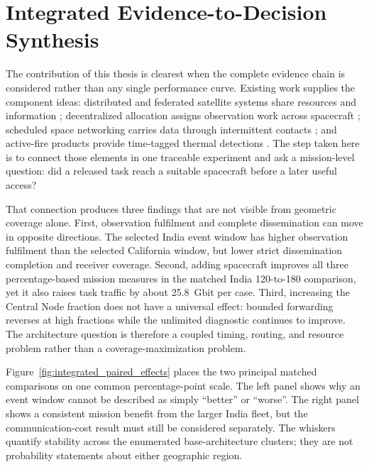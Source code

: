 \clearpage
\section{Integrated Evidence-to-Decision Synthesis}
\label{sec:integrated_synthesis}

The contribution of this thesis is clearest when the complete evidence chain is considered rather than any single performance curve. Existing work supplies the component ideas: distributed and federated satellite systems share resources and information \citep{Golkar2015,Scrocciolani2024,Messina2025}; decentralized allocation assigns observation work across spacecraft \citep{Parjan2023,Zilberstein2025}; scheduled space networking carries data through intermittent contacts \citep{Burleigh2022,Araniti2015,CCSDS2019}; and active-fire products provide time-tagged thermal detections \citep{Wooster2005,Schroeder2014,WoosterSLSTR2012,XuWooster2023}. The step taken here is to connect those elements in one traceable experiment and ask a mission-level question: did a released task reach a suitable spacecraft before a later useful access?

That connection produces three findings that are not visible from geometric coverage alone. First, observation fulfilment and complete dissemination can move in opposite directions. The selected India event window has higher observation fulfilment than the selected California window, but lower strict dissemination completion and receiver coverage. Second, adding spacecraft improves all three percentage-based mission measures in the matched India 120-to-180 comparison, yet it also raises task traffic by about 25.8~Gbit per case. Third, increasing the Central Node fraction does not have a universal effect: bounded forwarding reverses at high fractions while the unlimited diagnostic continues to improve. The architecture question is therefore a coupled timing, routing, and resource problem rather than a coverage-maximization problem.

Figure~\ref{fig:integrated_paired_effects} places the two principal matched comparisons on one common percentage-point scale. The left panel shows why an event window cannot be described as simply ``better'' or ``worse''. The right panel shows a consistent mission benefit from the larger India fleet, but the communication-cost result must still be considered separately. The whiskers quantify stability across the enumerated base-architecture clusters; they are not probability statements about either geographic region.


